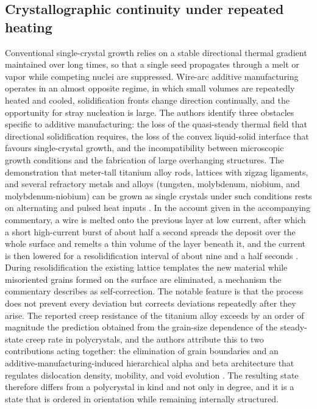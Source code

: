 \documentclass[11pt]{article}
\theoremstyle{definition}
\begin{document}
\subsection{Crystallographic continuity under repeated heating}

Conventional single-crystal growth relies on a stable directional thermal gradient maintained over long times, so that a single seed propagates through a melt or vapor while competing nuclei are suppressed. Wire-arc additive manufacturing operates in an almost opposite regime, in which small volumes are repeatedly heated and cooled, solidification fronts change direction continually, and the opportunity for stray nucleation is large. The authors identify three obstacles specific to additive manufacturing: the loss of the quasi-steady thermal field that directional solidification requires, the loss of the convex liquid-solid interface that favours single-crystal growth, and the incompatibility between microscopic growth conditions and the fabrication of large overhanging structures. The demonstration that meter-tall titanium alloy rods, lattices with zigzag ligaments, and several refractory metals and alloys (tungsten, molybdenum, niobium, and molybdenum-niobium) can be grown as single crystals under such conditions rests on alternating and pulsed heat inputs \cite{liu2026}. In the account given in the accompanying commentary, a wire is melted onto the previous layer at low current, after which a short high-current burst of about half a second spreads the deposit over the whole surface and remelts a thin volume of the layer beneath it, and the current is then lowered for a resolidification interval of about nine and a half seconds \cite{rohrer2026}. During resolidification the existing lattice templates the new material while misoriented grains formed on the surface are eliminated, a mechanism the commentary describes as self-correction. The notable feature is that the process does not prevent every deviation but corrects deviations repeatedly after they arise. The reported creep resistance of the titanium alloy exceeds by an order of magnitude the prediction obtained from the grain-size dependence of the steady-state creep rate in polycrystals, and the authors attribute this to two contributions acting together: the elimination of grain boundaries and an additive-manufacturing-induced hierarchical alpha and beta architecture that regulates dislocation density, mobility, and void evolution \cite{liu2026}. The resulting state therefore differs from a polycrystal in kind and not only in degree, and it is a state that is ordered in orientation while remaining internally structured.
\end{document}
